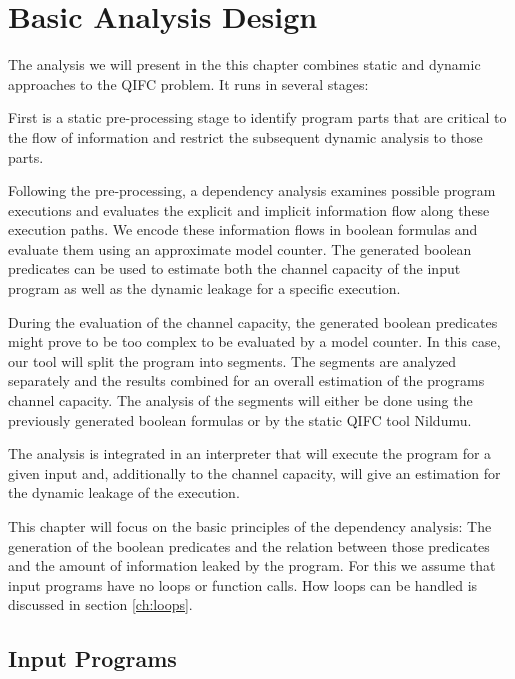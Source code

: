 \chapter{Basic Analysis Design}\label{sec:design}

The analysis we will present in the this chapter combines static and dynamic approaches to the QIFC problem. It runs in several stages:

First is a static pre-processing stage to identify program parts that are critical to the flow of information and restrict the subsequent dynamic analysis to those parts.

Following the pre-processing, a dependency analysis examines possible program executions and evaluates the explicit and implicit information flow along these execution paths. We encode these information flows in boolean formulas and evaluate them using an approximate model counter. The generated boolean predicates can be used to estimate both the channel capacity of the input program as well as the dynamic leakage for a specific execution.

During the evaluation of the channel capacity, the generated boolean predicates might prove to be too complex to be evaluated by a model counter. In this case, our tool will split the program into segments. The segments are analyzed separately and the results combined for an overall estimation of the programs channel capacity. The analysis of the segments will either be done using the previously generated boolean formulas or by the static QIFC tool Nildumu.

The analysis is integrated in an interpreter that will execute the program for a given input and, additionally to the channel capacity, will give an estimation for the dynamic leakage of the execution.

This chapter will focus on the basic principles of the dependency analysis: The generation of the boolean predicates and the relation between those predicates and the amount of information leaked by the program. For this we assume that input programs have no loops or function calls. How loops can be handled is discussed in section \ref{ch:loops}.

\section{Input Programs}\label{sec:inputLang}

